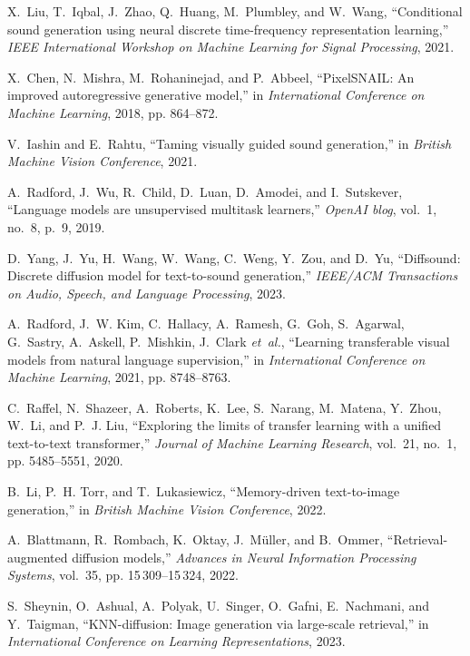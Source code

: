 \documentclass{article}
\begin{document}
\begin{thebibliography}{10}
X.~Liu, T.~Iqbal, J.~Zhao, Q.~Huang, M.~Plumbley, and W.~Wang, ``Conditional sound generation using neural discrete time-frequency representation learning,'' \emph{IEEE International Workshop on Machine Learning for Signal Processing}, 2021.

X.~Chen, N.~Mishra, M.~Rohaninejad, and P.~Abbeel, ``{PixelSNAIL}: An improved autoregressive generative model,'' in \emph{International Conference on Machine Learning}, 2018, pp. 864--872.

V.~Iashin and E.~Rahtu, ``Taming visually guided sound generation,'' in \emph{British Machine Vision Conference}, 2021.

A.~Radford, J.~Wu, R.~Child, D.~Luan, D.~Amodei, and I.~Sutskever, ``Language models are unsupervised multitask learners,'' \emph{OpenAI blog}, vol.~1, no.~8, p.~9, 2019.

D.~Yang, J.~Yu, H.~Wang, W.~Wang, C.~Weng, Y.~Zou, and D.~Yu, ``Diffsound: Discrete diffusion model for text-to-sound generation,'' \emph{IEEE/ACM Transactions on Audio, Speech, and Language Processing}, 2023.

A.~Radford, J.~W. Kim, C.~Hallacy, A.~Ramesh, G.~Goh, S.~Agarwal, G.~Sastry, A.~Askell, P.~Mishkin, J.~Clark \emph{et~al.}, ``Learning transferable visual models from natural language supervision,'' in \emph{International Conference on Machine Learning}, 2021, pp. 8748--8763.

C.~Raffel, N.~Shazeer, A.~Roberts, K.~Lee, S.~Narang, M.~Matena, Y.~Zhou, W.~Li, and P.~J. Liu, ``Exploring the limits of transfer learning with a unified text-to-text transformer,'' \emph{Journal of Machine Learning Research}, vol.~21, no.~1, pp. 5485--5551, 2020.

B.~Li, P.~H. Torr, and T.~Lukasiewicz, ``Memory-driven text-to-image generation,'' in \emph{British Machine Vision Conference}, 2022.

A.~Blattmann, R.~Rombach, K.~Oktay, J.~M{\"u}ller, and B.~Ommer, ``Retrieval-augmented diffusion models,'' \emph{Advances in Neural Information Processing Systems}, vol.~35, pp. 15\,309--15\,324, 2022.

S.~Sheynin, O.~Ashual, A.~Polyak, U.~Singer, O.~Gafni, E.~Nachmani, and Y.~Taigman, ``{KNN}-diffusion: Image generation via large-scale retrieval,'' in \emph{International Conference on Learning Representations}, 2023.


\end{thebibliography}
\end{document}
